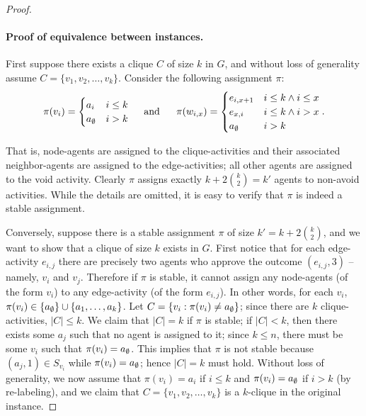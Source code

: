 \begin{proof}
	\paragraph{Proof of equivalence between instances.}	
	First suppose there exists a clique $C$ of size $k$ in $G$, and without loss of generality assume $C = \{v_1, v_2, \dots, v_k\}$. Consider the following assignment $\pi$:
	\begin{equation*}
	\pi(v_i) = \begin{cases} a_i & i \leq k \\ a_{\emptyset} & i > k \end{cases} 
	\mbox{~~~~and~~~~~} 
	\pi(w_{i,x}) = \begin{cases} e_{i, x+1} & i \leq k \land i \leq x \\ e_{x, i} & i \leq k \land i > x \\  a_{\emptyset} & i > k \end{cases}.
	\end{equation*}

	That is, node-agents are assigned to the clique-activities and their associated neighbor-agents are assigned to the edge-activities; all other agents are assigned to the void activity. Clearly $\pi$ assigns exactly $k + 2\binom{k}{2} = k'$ agents to non-avoid activities. While the details are omitted, it is easy to verify that $\pi$ is indeed a stable assignment.
	
	Conversely, suppose there is a stable assignment $\pi$ of size $k'=k+2\binom{k}{2}$, and we want to show that a clique of size $k$ exists in $G$. 
	First notice that for each edge-activity $e_{i,j}$ there are precisely two agents who approve the outcome $(e_{i,j}, 3)$ -- namely, $v_i$ and $v_j$. Therefore if $\pi$ is stable, it cannot assign any node-agents (of the form $v_i$) to any edge-activity (of the form $e_{i,j}$). In other words, for each $v_i$, $\pi(v_i) \in \{a_{\emptyset}\}\cup\{a_1, \dots, a_k\}$. Let $C = \{v_i : \pi(v_i) \neq a_{\emptyset} \}$; since there are $k$ clique-activities, $|C| \leq k$. We claim that $|C| = k$ if $\pi$ is stable; if $|C| < k$, then there exists some $a_j$ such that no agent is assigned to it; since $k \leq n$, there must be some $v_i$ such that $\pi(v_i) = a_{\emptyset}$. This implies that $\pi$ is not stable because $(a_j, 1) \in S_{v_i}$ while $\pi(v_i) = a_{\emptyset}$; hence $|C| = k$ must hold. Without loss of generality, we now assume that $\pi(v_i) = a_i$ if $i \leq k$ and $\pi(v_i) = a_{\emptyset}$ if $i > k$ (by re-labeling), and we claim that $C = \{v_1, v_2, \dots, v_k\}$ is a $k$-clique in the original instance.
	

\end{proof}
